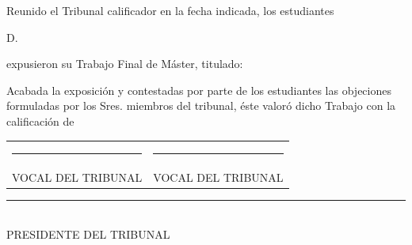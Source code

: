\begin{officialpage}
\vspace*{0.5cm}
\begin{center}
\end{center}

\vspace{2.3cm}

{\fontsize{12}{15}\selectfont
Reunido el Tribunal calificador en la fecha indicada, los estudiantes

\vspace{0.8cm}
\hspace*{1cm} D. \TFMEstudiantesActa

\vspace{0.8cm}
expusieron su Trabajo Final de Máster, titulado:
}

\vspace{1.0cm}

\begin{center}
{\fontsize{14}{17}\selectfont \TFMTitulo}
\end{center}

\vspace{1.0cm}

{\fontsize{12}{15}\selectfont
Acabada la exposición y contestadas por parte de los estudiantes las objeciones formuladas por los Sres. miembros del tribunal, éste valoró dicho Trabajo con la calificación de

\vspace{0.8cm}
\begin{center}
\TFMCalificacion
\end{center}

\vspace{0.8cm}
\TFMFechaActa
}

\vfill

\begin{center}
\begin{tabular}{>{\centering\arraybackslash}p{}
                >{\centering\arraybackslash}p{}}
\rule{5.4cm}{0.4pt} & \rule{5.4cm}{0.4pt} \\
VOCAL DEL TRIBUNAL & VOCAL DEL TRIBUNAL
\end{tabular}

\vspace{2.0cm}

\rule{5.8cm}{0.4pt}\\
PRESIDENTE DEL TRIBUNAL
\end{center}
\end{officialpage}
